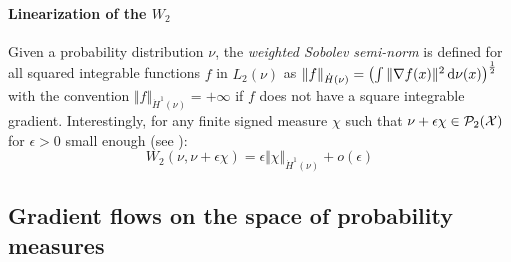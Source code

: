 \paragraph{Linearization of the $W_2$} Given a probability distribution $\nu$, the \textit{weighted Sobolev semi-norm} is defined for all squared integrable functions $f$ in $L_2(\nu)$ as $ \Vert f \Vert_{\dot{H}(\nu)} = \left(\int \Vert \nabla f(x) \Vert^2 \mathop{}\!\mathrm{d} \nu(x) \right)^{\frac{1}{2}}$ with the convention $\Vert f \Vert_{\dot{H}^1(\nu)} = +\infty$ if $f$ does not have a square integrable gradient. Interestingly, for any finite signed measure $\chi$ such that $\nu + \epsilon \chi \in {{\mathcal P}}_2({{\mathcal X}})$ for $\epsilon >0$ small enough (see \cite{Villani:2009}):
\begin{equation}
W_2(\nu, \nu+ \epsilon \chi) = \epsilon \Vert \chi \Vert_{\dot{H}^1(\nu)}+ o(\epsilon)
\end{equation}


\subsection{Gradient flows on the space of probability measures}\label{subsec:gradient_flows_functionals}


